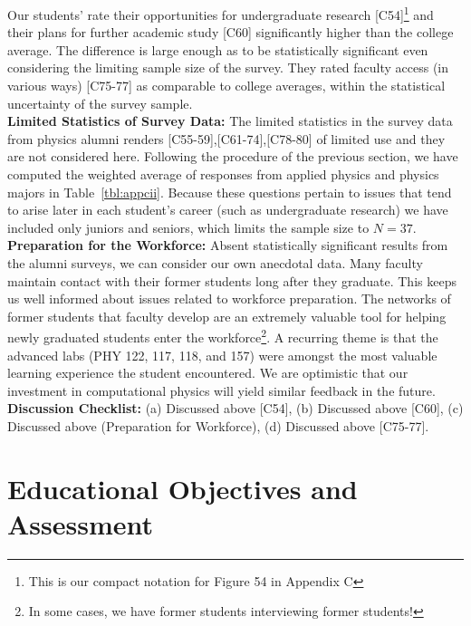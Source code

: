 \documentclass[12pt]{article}
\begin{document}
\noindent
Our students' rate their opportunities for undergraduate research
[C54]\footnote{This is our compact notation for Figure 54 in Appendix C}
 and their plans for further academic study [C60] significantly 
higher than the college average.  The difference is
large enough as to be statistically significant even considering the
limiting sample size of the survey.  They rated faculty access (in
various ways) [C75-77] as comparable to college averages, within the
statistical uncertainty of the survey sample.\\[3pt]

\noindent
{\bf Limited Statistics of Survey Data:} The limited statistics in the
survey data from physics alumni renders [C55-59],[C61-74],[C78-80] of
limited use and they are not considered here.  Following the procedure
of the previous section, we have computed the weighted average of
responses from applied physics and physics majors in
Table~\ref{tbl:appcii}.  Because these questions pertain to issues
that tend to arise later in each student's career (such as undergraduate
research) we have included only juniors and seniors, which limits the
sample size to $N=37$.\\[3pt]

\noindent
{\bf Preparation for the Workforce:} Absent statistically significant
results from the alumni surveys, we can consider our own anecdotal
data.  Many faculty maintain contact with their former students long
after they graduate.  This keeps us well informed about issues related
to workforce preparation.  The networks of former students that
faculty develop are an extremely valuable tool for helping newly
graduated students enter the workforce\footnote{In some cases, we have
  former students interviewing former students!}.  A recurring theme
is that the advanced labs (PHY 122, 117, 118, and 157) were amongst the most
valuable learning experience the student encountered.  We are
optimistic that our investment in computational physics will yield
similar feedback in the future.\\[3pt]

\noindent
{\bf Discussion Checklist:} (a) Discussed above [C54], (b) Discussed
above [C60], (c) Discussed above (Preparation for Workforce), (d)
Discussed above [C75-77].

\newpage
\section{Educational Objectives and Assessment}
\end{document}
